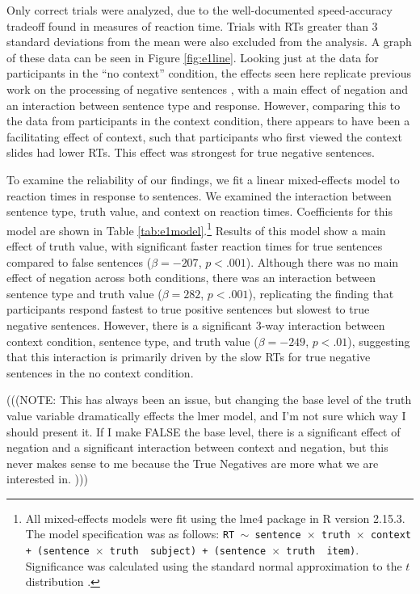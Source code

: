 \documentclass[10pt,letterpaper]{article}
\begin{document}
Only correct trials were analyzed, due to the well-documented speed-accuracy tradeoff found in measures of reaction time.  Trials with RTs greater than 3 standard deviations from the mean were also excluded from the analysis.  A graph of these data can be seen in Figure \ref{fig:e1line}.  Looking just at the data for participants in the ``no context'' condition, the effects seen here replicate previous work on the processing of negative sentences \cite{hclark1972, carpenter1975, just1971, just1976}, with a main effect of negation and an interaction between sentence type and response.  However, comparing this to the data from participants in the context condition, there appears to have been a facilitating effect of context, such that participants who first viewed the context slides had lower RTs.  This effect was strongest for true negative sentences.  

To examine the reliability of our findings, we fit a linear mixed-effects model to reaction times in response to sentences.  We examined the interaction between sentence type, truth value, and context on reaction times.    Coefficients for this model are shown in Table \ref{tab:e1model}.\footnote{All mixed-effects models were fit using the lme4 package in R version 2.15.3.  The model specification was as follows: \texttt{RT $\sim$ sentence~$\times$~truth~$\times$~context + (sentence~$\times$~truth~\textbar~subject) +  (sentence~$\times$~truth~\textbar~item)}.  Significance was calculated using the standard normal approximation to the $t$ distribution \cite{barr2013}.}  Results of this model show a main effect of truth value, with significant faster reaction times for true sentences compared to false sentences ($\beta= -207$, $p< .001$).  Although there was no main effect of negation across both conditions, there was an interaction between sentence type and truth value ($\beta= 282$, $p< .001$), replicating the finding that participants respond fastest to true positive sentences but slowest to true negative sentences.  However, there is a significant 3-way interaction between context condition, sentence type, and truth value ($\beta= -249$, $p< .01$), suggesting that this interaction is primarily driven by the slow RTs for true negative sentences in the no context condition.  

(((NOTE:  This has always been an issue, but changing the base level of the truth value variable dramatically effects the lmer model, and I'm not sure which way I should present it.  If I make FALSE the base level, there is a significant effect of negation and a significant interaction between context and negation, but this never makes sense to me because the True Negatives are more what we are interested in.  )))
\end{document}
